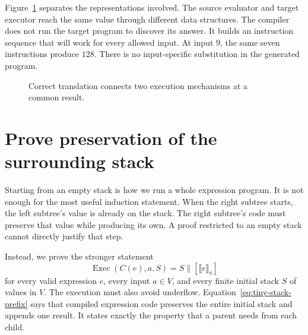 Figure~\ref{fig:tiny-stack-boundary} separates the representations involved.
The source evaluator and target executor reach the same value through different data structures.
The compiler does not run the target program to discover its answer.
It builds an instruction sequence that will work for every allowed input.
At input $9$, the same seven instructions produce $128$.
There is no input-specific substitution in the generated program.

\begin{figure}
  \centering
  \caption{Correct translation connects two execution mechanisms at a common result.}
  \label{fig:tiny-stack-boundary}
\end{figure}

\section{Prove preservation of the surrounding stack}
\label{sec:tiny-stack-proof}

Starting from an empty stack is how we run a whole expression program.
It is not enough for the most useful induction statement.
When the right subtree starts, the left subtree's value is already on the stack.
The right subtree's code must preserve that value while producing its own.
A proof restricted to an empty stack cannot directly justify that step.

Instead, we prove the stronger statement
\begin{equation}
  \operatorname{Exec}(C(e),a,S)
  = S\mathbin{\|}[\llbracket e\rrbracket_a]
  \label{eq:tiny-stack-prefix}
\end{equation}
for every valid expression $e$, every input $a\in V$, and every finite initial stack $S$ of values in $V$.
The execution must also avoid underflow.
Equation~\ref{eq:tiny-stack-prefix} says that compiled expression code preserves the entire initial stack and appends one result.
It states exactly the property that a parent needs from each child.

